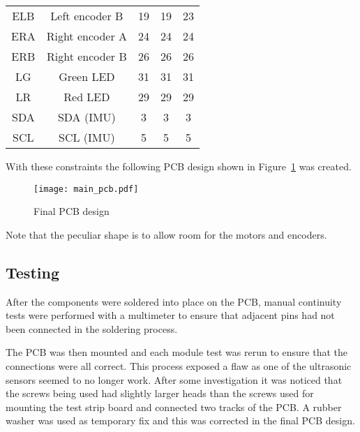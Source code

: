 \begin{table}[!ht]
\begin{tabular}{ccccc}
        ELB & Left encoder B         & 19 & 19 & 23 \\
        ERA & Right encoder A        & 24 & 24 & 24 \\
        ERB & Right encoder B        & 26 & 26 & 26 \\
        LG  & Green LED              & 31 & 31 & 31 \\
        LR  & Red LED                & 29 & 29 & 29 \\
        SDA & \isc{} SDA (IMU)       & 3  & 3  & 3  \\
        SCL & \isc{} SCL (IMU)       & 5  & 5  & 5  \\
        \bottomrule
    \end{tabular}
\end{table}

With these constraints the following PCB design shown in Figure~\ref{PCB_Design} was created.

\begin{figure}[!ht]
	\centering
	\texttt{[image: main\_pcb.pdf]}
	\caption{Final PCB design}\label{PCB_Design}

\end{figure}
Note that the peculiar shape is to allow room for the motors and encoders.

\subsection{Testing}\label{elec/pcb/test}
After the components were soldered into place on the PCB, manual
continuity tests were performed with a multimeter to ensure that adjacent
pins had not been connected in the soldering process.

The PCB was then mounted and each module test was rerun to ensure that the
connections were all correct. This process exposed a flaw as one of the
ultrasonic sensors seemed to no longer work. After some investigation it
was noticed that the screws being used had slightly larger heads than the
screws used for mounting the test strip board and connected two
tracks of the PCB. A rubber washer was used as temporary fix and this was
corrected in the final PCB design.
